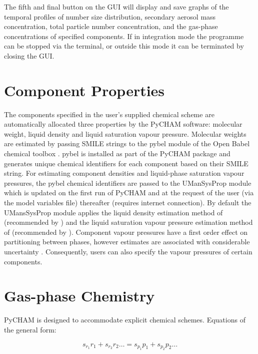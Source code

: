 \documentclass[gmd, manuscript]{copernicus}
\begin{document}
The fifth and final button on the GUI will display and save graphs of the temporal profiles of number size distribution, secondary aerosol mass concentration, total particle number concentration, and the gas-phase concentrations of specified components.  If in integration mode the programme can be stopped via the terminal, or outside this mode it can be terminated by closing the GUI.

\section{Component Properties}

The components specified in the user's supplied chemical scheme are automatically allocated three properties by the PyCHAM software: molecular weight, liquid density and liquid saturation vapour pressure.  Molecular weights are  estimated by passing SMILE strings to the pybel module of the Open Babel chemical toolbox \citep{OBoyle2011}.  pybel is installed as part of the PyCHAM package and generates unique chemical identifiers for each component based on their SMILE string.  For estimating component densities and liquid-phase saturation vapour pressures, the pybel chemical identifiers are passed to the UManSysProp module \citep{Topping2016} which is updated on the first run of PyCHAM and at the request of the user (via the model variables file) thereafter (requires internet connection).  By default the UMansSysProp module applies the liquid density estimation method of \citet{Girolami1994} (recommended by \citet{Barley2013}) and the liquid saturation vapour pressure estimation method of \citet{Nannoolal2008} (recommended by \citet{OMeara2014}).  Component vapour pressures have a first order effect on partitioning between phases, however estimates are associated with considerable uncertainty \citep{OMeara2014}.  Consequently, users can also specify the vapour pressures of certain components.

\section{Gas-phase Chemistry}

PyCHAM is designed to accommodate explicit chemical schemes.  Equations of the general form:

\begin{equation} \label{eq:genchemreac}
s_{r_{1}}r_{1}+s_{r_{2}}r_{2} \ldots=s_{p_{1}}p_{1}+s_{p_{2}}p_{2}\ldots
\end{equation}
\end{document}
